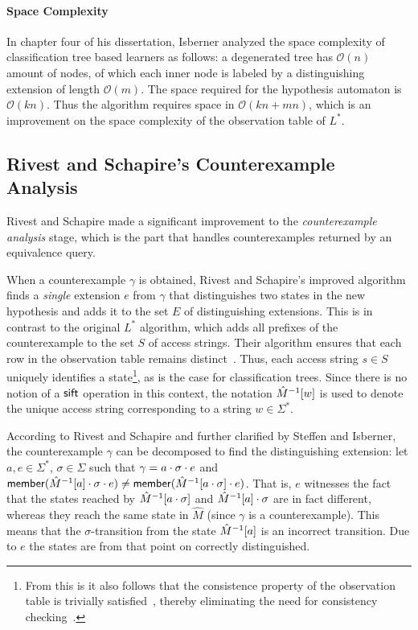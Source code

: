 \documentclass[multi,crop=false,class=article]{standalone}
\begin{document}
\paragraph{Space Complexity} In chapter four of his dissertation, Isberner
analyzed the space complexity of classification tree based learners as follows:
a degenerated tree has $\mathcal{O}(n)$ amount of nodes, of which each inner
node is labeled by a distinguishing extension of length
$\mathcal{O}(m)$\cite{Isberner2015a}. The space required for the hypothesis
automaton is $\mathcal{O}(kn)$\cite{Isberner2015a}. Thus the algorithm requires
space in $\mathcal{O}(kn + mn)$\cite{Isberner2014b,Isberner2015a}, which is an
improvement on the space complexity of the observation table of $L^*$.

\subsection{Rivest and Schapire's Counterexample Analysis}
\label{sec:rivest-schap-count}
Rivest and Schapire made a significant improvement\cite{Rivest1993} to the
\textit{counterexample analysis} stage, which is the part that handles
counterexamples returned by an equivalence query.

When a counterexample $\gamma$ is obtained, Rivest and Schapire's improved
algorithm finds a \textit{single} extension $e$ from $\gamma$ that distinguishes
two states in the new hypothesis and adds it to the set $E$ of distinguishing
extensions. This is in contrast to the original $L^*$ algorithm, which adds all
prefixes of the counterexample to the set $S$ of access strings. Their algorithm
ensures that each row in the observation table remains
distinct~\cite{Rivest1993}. Thus, each access string $s \in S$ uniquely
identifies a state\footnote{From this is it also follows that the consistence
  property of the observation table is trivially satisfied~\cite{Rivest1993},
  thereby eliminating the need for consistency checking~\cite{Howar2014}.}, as
is the case for classification trees. Since there is no notion of a $\mathsf{sift}$
operation in this context, the notation $\hat M^{-1}[w]$ is used to denote
the unique access string corresponding to a string $w \in \Sigma^*$.

According to Rivest and Schapire\cite{Rivest1993} and further clarified by
Steffen\cite{Steffen2011} and Isberner\cite{Isberner2014a}, the counterexample
$\gamma$ can be decomposed to find the distinguishing extension: let
$a, e \in \Sigma^*$, $\sigma \in \Sigma$ such that
$\gamma = a \cdot \sigma \cdot e$ and
$\mathsf{member}(\hat M^{-1}[a]\cdot\sigma\cdot e) \neq \mathsf{member}(\hat
  M^{-1}[a\cdot\sigma]\cdot e)$. That is, $e$ witnesses the fact that the states
reached by $\hat M^{-1}[a\cdot\sigma]$ and
$\hat M^{-1}[a]\cdot\sigma$ are in fact different, whereas they reach the
same state in $\hat M$ (since $\gamma$ is a counterexample). This means that the
$\sigma$-transition from the state $\hat M^{-1}[a]$ is an incorrect
transition. Due to $e$ the states are from that point on correctly
distinguished.
\end{document}
